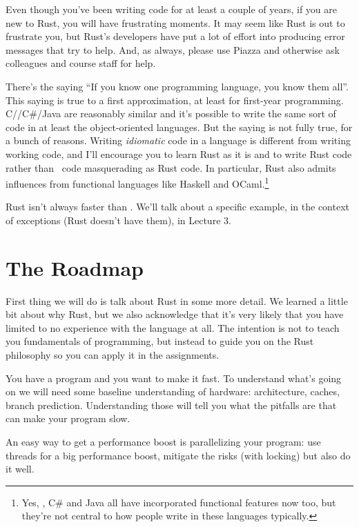 Even though you've been writing code for at least a couple of years, if you are new to Rust, you will have frustrating moments.
It may seem like Rust is out to frustrate you, but Rust's developers have put a lot of effort into producing error messages that try to help. And, as always, please use Piazza and otherwise ask colleagues and course staff for help.

There's the saying ``If you know one programming language, you know them all''. This saying is true to a first approximation, at least for first-year programming. C/\CPP/C\#/Java are reasonably similar and it's possible to write the same sort of code in at least the object-oriented languages. But the saying is not fully true, for a bunch of reasons. Writing \emph{idiomatic} code in a language is different from writing working code, and I'll encourage you to learn Rust as it is and to write Rust code rather than \CPP~code masquerading as Rust code. In particular, Rust also admits influences from functional languages like Haskell and OCaml.\footnote{Yes, \CPP, C\# and Java all have incorporated functional features now too, but they're not central to how people write in these languages typically.}

Rust isn't always faster than \CPP. We'll talk about a specific example, in the context of exceptions (Rust doesn't have them), in Lecture 3.

\section*{The Roadmap}
First thing we will do is talk about Rust in some more detail. We learned a little bit about why Rust, but we also acknowledge that it's very likely that you have limited to no experience with the language at all. The intention is not to teach you fundamentals of programming, but instead to guide you on the Rust philosophy so you can apply it in the assignments. 

You have a program and you want to make it fast. To understand what's going on we will need some baseline understanding of hardware: architecture, caches, branch prediction. Understanding those will tell you what the pitfalls are that can make your program slow.

An easy way to get a performance boost is parallelizing your program: use threads for a big performance boost, mitigate the risks (with locking) but also do it well. 

